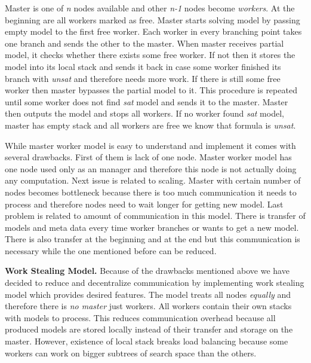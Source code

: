 \documentclass[letterpaper]{article}
\newcommand{\mypar}[1]{{\bf #1.}}
\begin{document}
Master is one of \textit{n} nodes available and other \textit{n-1} nodes become \textit{workers}. At the beginning are all workers marked as free. Master starts solving model by passing empty model to the first free worker. Each worker in every branching point takes one branch and sends the other to the master. When master receives partial model, it checks whether there exists some free worker. If not then it stores the model into its local stack and sends it back in case some worker finished its branch with \textit{unsat} and therefore needs more work. If there is still some free worker then master bypasses the partial model to it. This procedure is repeated until some worker does not find \textit{sat} model and sends it to the master. Master then outputs the model and stops all workers. If no worker found \textit{sat} model, master has empty stack and all workers are free we know that formula is \textit{unsat}.

While master worker model is easy to understand and implement it comes with several drawbacks. First of them is lack of one node. Master worker model has one node used only as an manager and therefore this node is not actually doing any computation. Next issue is related to scaling. Master with certain number of nodes becomes bottleneck because there is too much communication it needs to process and therefore nodes need to wait longer for getting new model. Last problem is related to amount of communication in this model. There is transfer of models and meta data every time worker branches or wants to get a new model. There is also transfer at the beginning and at the end but this communication is necessary while the one mentioned before can be reduced.  

\mypar{Work Stealing Model} Because of the drawbacks mentioned above we have decided to reduce and decentralize communication by implementing work stealing model which provides desired features. The model treats all nodes \textit{equally} and therefore there is \textit{no master} just workers. All workers contain their own stacks with models to process. This reduces communication overhead because all produced models are stored locally instead of their transfer and storage on the master. However, existence of local stack breaks load balancing because some workers can work on bigger subtrees of search space than the others.
\end{document}
